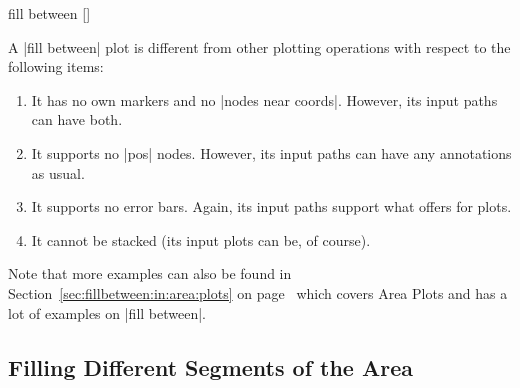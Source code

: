 \begin{addplotoperation}[]{fill between}{%
    []
}
\begin{codeexample}[]
\end{codeexample}
    A |fill between| plot is different from other plotting operations with
    respect to the following items:
    \begin{enumerate}
        \item It has no own markers and no |nodes near coords|. However, its
            input paths can have both.
        \item It supports no |pos| nodes. However, its input paths can have
            any annotations as usual.
        \item It supports no error bars. Again, its input paths support what
            \PGFPlots{} offers for plots.
        \item It cannot be stacked (its input plots can be, of course).
    \end{enumerate}

    Note that more examples can also be found in
    Section~\ref{sec:fillbetween:in:area:plots} on
    page~\pageref{sec:fillbetween:in:area:plots} which covers Area Plots and
    has a lot of examples on |fill between|.
\end{addplotoperation}


\subsection{Filling Different Segments of the Area}

